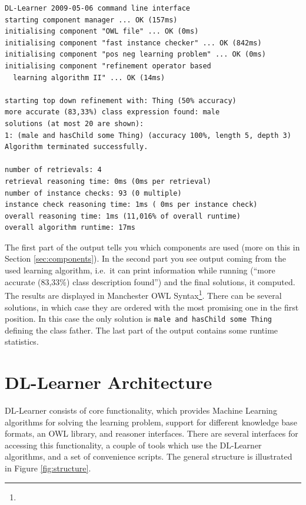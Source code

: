 \documentclass[a4paper,12pt]{scrartcl}
\begin{document}
\begin{verbatim}
DL-Learner 2009-05-06 command line interface
starting component manager ... OK (157ms)
initialising component "OWL file" ... OK (0ms)
initialising component "fast instance checker" ... OK (842ms)
initialising component "pos neg learning problem" ... OK (0ms)
initialising component "refinement operator based 
  learning algorithm II" ... OK (14ms)

starting top down refinement with: Thing (50% accuracy)
more accurate (83,33%) class expression found: male
solutions (at most 20 are shown):
1: (male and hasChild some Thing) (accuracy 100%, length 5, depth 3)
Algorithm terminated successfully.

number of retrievals: 4
retrieval reasoning time: 0ms (0ms per retrieval)
number of instance checks: 93 (0 multiple)
instance check reasoning time: 1ms ( 0ms per instance check)
overall reasoning time: 1ms (11,016% of overall runtime)
overall algorithm runtime: 17ms
\end{verbatim}

The first part of the output tells you which components are used (more on this in Section \ref{sec:components}). In the second part you see output coming from the used learning algorithm, i.e.~it can print information while running (``more accurate (83,33\%) class description found'') and the final solutions, it computed. The results are displayed in Manchester OWL Syntax\footnote{\mos}. There can be several solutions, in which case they are ordered with the most promising one in the first position. In this case the only solution is \verb|male and hasChild some Thing| defining the class father. The last part of the output contains some runtime statistics.

\section{DL-Learner Architecture}

DL-Learner consists of core functionality, which provides Machine Learning algorithms for solving the learning problem, support for different knowledge base formats, an OWL library, and reasoner interfaces. There are several interfaces for accessing this functionality, a couple of tools which use the DL-Learner algorithms, and a set of convenience scripts. The general structure is illustrated in Figure \ref{fig:structure}.
\end{document}
